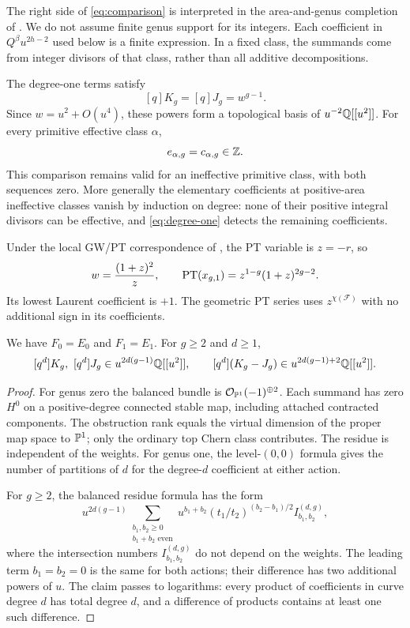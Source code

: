 The right side of \eqref{eq:comparison} is interpreted in the
area-and-genus completion of \cite{IP}. We do not assume finite
genus support for its integers. Each coefficient in $Q^\beta u^{2h-2}$
used below is a finite expression. In a fixed class, the summands
come from integer divisors of that class, rather than all additive
decompositions.

The degree-one terms satisfy
\begin{equation}\label{eq:degree-one}
 [q]K_g=[q]J_g=w^{g-1}.
\end{equation}
Since $w=u^2+O(u^4)$, these powers form a topological basis of
$u^{-2}\mathbb Q[[u^2]]$. For every primitive effective class $\alpha$,
\begin{equation}\label{eq:primitive-equality}
 e_{\alpha,g}=c_{\alpha,g}\in\mathbb Z.
\end{equation}
This comparison remains valid for an ineffective primitive class,
with both sequences zero. More generally the elementary coefficients
at positive-area ineffective classes vanish by induction on degree:
none of their positive integral divisors can be effective, and
\eqref{eq:degree-one} detects the remaining coefficients.

Under the local GW/PT correspondence of
\cite[Corollary 4.9]{Pardon}, the PT variable is $z=-r$, so
\begin{equation}\label{eq:pt-one}
 w=\frac{(1+z)^2}{z},\qquad
 \operatorname{PT}(x_{g,1})=z^{1-g}(1+z)^{2g-2}.
\end{equation}
Its lowest Laurent coefficient is $+1$. The geometric PT series
uses $z^{\chi(\mathcal F)}$ with no additional sign in its coefficients.

\begin{lemma}\label{lem:order}
We have $F_0=E_0$ and $F_1=E_1$. For $g\ge2$ and $d\ge1$,
\[
 [q^d]K_g,\ [q^d]J_g\in u^{2d(g-1)}\mathbb Q[[u^2]],\qquad
 [q^d](K_g-J_g)\in u^{2d(g-1)+2}\mathbb Q[[u^2]].
\]
\end{lemma}
\begin{proof}
For genus zero the balanced bundle is
$\mathcal O_{\mathbb P^1}(-1)^{\oplus2}$. Each summand has zero $H^0$
on a positive-degree connected stable map, including attached
contracted components. The obstruction rank equals the virtual
dimension of the proper map space to $\mathbb P^1$; only the ordinary
top Chern class contributes. The residue is independent of the
weights. For genus one, the level-$(0,0)$ formula
\cite[Theorem 5.2]{BP} gives the number of partitions of $d$ for
the degree-$d$ coefficient at either action.

For $g\ge2$, the balanced residue formula
\cite[Section 2.2]{BP} has the form
\[
 u^{2d(g-1)}
 \sum_{\substack{b_1,b_2\ge0\\b_1+b_2\text{ even}}}
 u^{b_1+b_2}(t_1/t_2)^{(b_2-b_1)/2}I^{(d,g)}_{b_1,b_2},
\]
where the intersection numbers $I^{(d,g)}_{b_1,b_2}$ do not depend
on the weights. The leading term $b_1=b_2=0$ is the same for both
actions; their difference has two additional powers of $u$.
The claim passes to logarithms: every product of coefficients in
curve degree $d$ has total degree $d$, and a difference of products
contains at least one such difference.
\end{proof}
